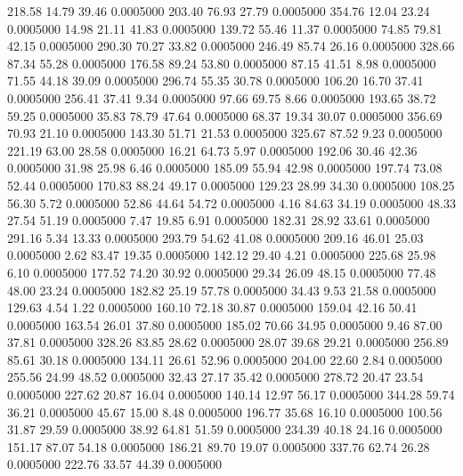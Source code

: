  218.58   14.79   39.46   0.0005000
 203.40   76.93   27.79   0.0005000
 354.76   12.04   23.24   0.0005000
  14.98   21.11   41.83   0.0005000
 139.72   55.46   11.37   0.0005000
  74.85   79.81   42.15   0.0005000
 290.30   70.27   33.82   0.0005000
 246.49   85.74   26.16   0.0005000
 328.66   87.34   55.28   0.0005000
 176.58   89.24   53.80   0.0005000
  87.15   41.51    8.98   0.0005000
  71.55   44.18   39.09   0.0005000
 296.74   55.35   30.78   0.0005000
 106.20   16.70   37.41   0.0005000
 256.41   37.41    9.34   0.0005000
  97.66   69.75    8.66   0.0005000
 193.65   38.72   59.25   0.0005000
  35.83   78.79   47.64   0.0005000
  68.37   19.34   30.07   0.0005000
 356.69   70.93   21.10   0.0005000
 143.30   51.71   21.53   0.0005000
 325.67   87.52    9.23   0.0005000
 221.19   63.00   28.58   0.0005000
  16.21   64.73    5.97   0.0005000
 192.06   30.46   42.36   0.0005000
  31.98   25.98    6.46   0.0005000
 185.09   55.94   42.98   0.0005000
 197.74   73.08   52.44   0.0005000
 170.83   88.24   49.17   0.0005000
 129.23   28.99   34.30   0.0005000
 108.25   56.30    5.72   0.0005000
  52.86   44.64   54.72   0.0005000
   4.16   84.63   34.19   0.0005000
  48.33   27.54   51.19   0.0005000
   7.47   19.85    6.91   0.0005000
 182.31   28.92   33.61   0.0005000
 291.16    5.34   13.33   0.0005000
 293.79   54.62   41.08   0.0005000
 209.16   46.01   25.03   0.0005000
   2.62   83.47   19.35   0.0005000
 142.12   29.40    4.21   0.0005000
 225.68   25.98    6.10   0.0005000
 177.52   74.20   30.92   0.0005000
  29.34   26.09   48.15   0.0005000
  77.48   48.00   23.24   0.0005000
 182.82   25.19   57.78   0.0005000
  34.43    9.53   21.58   0.0005000
 129.63    4.54    1.22   0.0005000
 160.10   72.18   30.87   0.0005000
 159.04   42.16   50.41   0.0005000
 163.54   26.01   37.80   0.0005000
 185.02   70.66   34.95   0.0005000
   9.46   87.00   37.81   0.0005000
 328.26   83.85   28.62   0.0005000
  28.07   39.68   29.21   0.0005000
 256.89   85.61   30.18   0.0005000
 134.11   26.61   52.96   0.0005000
 204.00   22.60    2.84   0.0005000
 255.56   24.99   48.52   0.0005000
  32.43   27.17   35.42   0.0005000
 278.72   20.47   23.54   0.0005000
 227.62   20.87   16.04   0.0005000
 140.14   12.97   56.17   0.0005000
 344.28   59.74   36.21   0.0005000
  45.67   15.00    8.48   0.0005000
 196.77   35.68   16.10   0.0005000
 100.56   31.87   29.59   0.0005000
  38.92   64.81   51.59   0.0005000
 234.39   40.18   24.16   0.0005000
 151.17   87.07   54.18   0.0005000
 186.21   89.70   19.07   0.0005000
 337.76   62.74   26.28   0.0005000
 222.76   33.57   44.39   0.0005000
